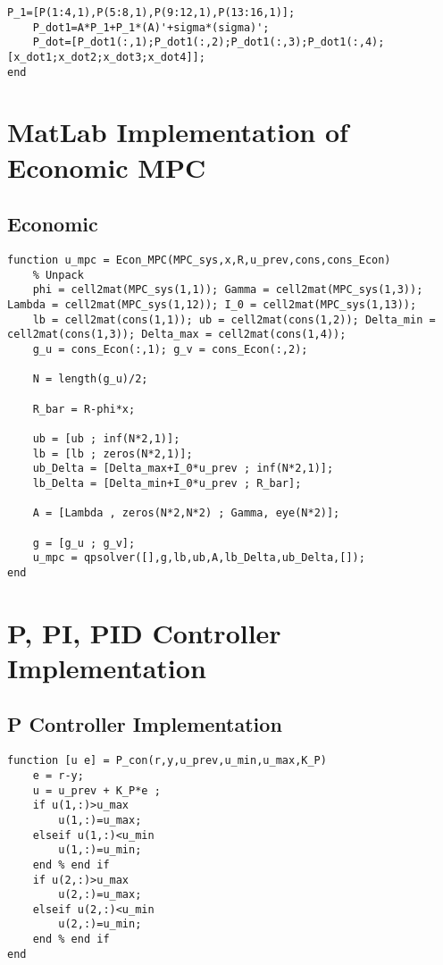 \begin{bilag}
\begin{appendices}
\begin{lstlisting}[breaklines]
    P_1=[P(1:4,1),P(5:8,1),P(9:12,1),P(13:16,1)];
    P_dot1=A*P_1+P_1*(A)'+sigma*(sigma)';
    P_dot=[P_dot1(:,1);P_dot1(:,2);P_dot1(:,3);P_dot1(:,4);[x_dot1;x_dot2;x_dot3;x_dot4]];
end
\end{lstlisting}

\section{MatLab Implementation of Economic MPC}
\subsection{Economic}
\label{app:Econ_MPC}
\begin{lstlisting}[breaklines]
function u_mpc = Econ_MPC(MPC_sys,x,R,u_prev,cons,cons_Econ)
    % Unpack
    phi = cell2mat(MPC_sys(1,1)); Gamma = cell2mat(MPC_sys(1,3)); Lambda = cell2mat(MPC_sys(1,12)); I_0 = cell2mat(MPC_sys(1,13)); 
    lb = cell2mat(cons(1,1)); ub = cell2mat(cons(1,2)); Delta_min = cell2mat(cons(1,3)); Delta_max = cell2mat(cons(1,4));
    g_u = cons_Econ(:,1); g_v = cons_Econ(:,2);
    
    N = length(g_u)/2;
    
    R_bar = R-phi*x;
    
    ub = [ub ; inf(N*2,1)];
    lb = [lb ; zeros(N*2,1)];
    ub_Delta = [Delta_max+I_0*u_prev ; inf(N*2,1)];
    lb_Delta = [Delta_min+I_0*u_prev ; R_bar];

    A = [Lambda , zeros(N*2,N*2) ; Gamma, eye(N*2)];
    
    g = [g_u ; g_v];    
    u_mpc = qpsolver([],g,lb,ub,A,lb_Delta,ub_Delta,[]);
end
\end{lstlisting}

\section{P, PI, PID Controller Implementation}
\subsection{P Controller Implementation}
\label{app:P_con}
\begin{lstlisting}[breaklines]
function [u e] = P_con(r,y,u_prev,u_min,u_max,K_P)
    e = r-y;
    u = u_prev + K_P*e ;
    if u(1,:)>u_max
        u(1,:)=u_max;
    elseif u(1,:)<u_min
        u(1,:)=u_min;
    end % end if
    if u(2,:)>u_max
        u(2,:)=u_max;
    elseif u(2,:)<u_min
        u(2,:)=u_min;
    end % end if
end
\end{lstlisting}


\end{appendices}
\end{bilag}
